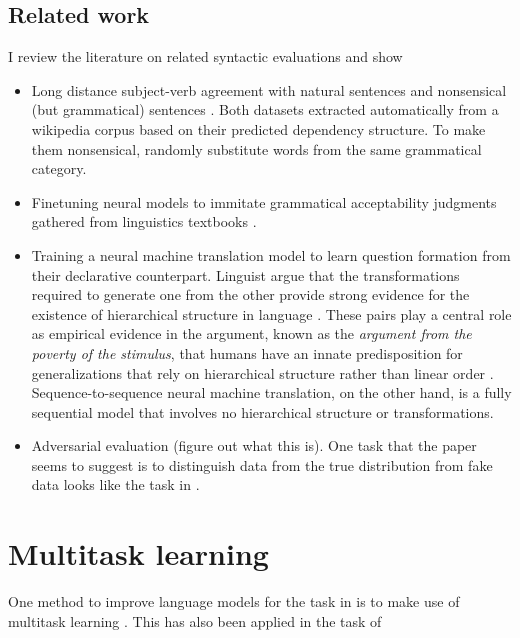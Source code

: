 \subsection{Related work}
I review the literature on related syntactic evaluations and show
\begin{itemize}
  \item Long distance subject-verb agreement with natural sentences \citep{Linzen+2016:LSTM-syntax,Kuncoro+2018:RNNG-deps,} and nonsensical (but grammatical) sentences \citep{Gulordava+2018:colorless-green}. Both datasets extracted automatically from a wikipedia corpus based on their predicted dependency structure. To make them nonsensical, \citet{Gulordava+2018:colorless-green} randomly substitute words from the same grammatical category.
  \item Finetuning neural models to immitate grammatical acceptability judgments gathered from linguistics textbooks \citet{DBLP:journals/corr/abs-1805-12471}.
  \item Training a neural machine translation model to learn question formation from their declarative counterpart\cite{McCoy+2018:RNN-pos}. Linguist argue that the transformations required to generate one from the other provide strong evidence for the existence of hierarchical structure in language \cite{Everaert+2015:structures}. These pairs play a central role as empirical evidence in the argument, known as the \textit{argument from the poverty of the stimulus}, that humans have an innate predisposition for generalizations that rely on hierarchical structure rather than linear order \citep{chomsky1980rules}. Sequence-to-sequence neural machine translation, on the other hand, is a fully sequential model that involves no hierarchical structure or transformations.
  \item Adversarial evaluation \citep{Smith2012:adversarial} (figure out what this is). One task that the paper seems to suggest is to distinguish data from the true distribution from fake data looks like the task in \citet{Linzen+2018:targeted}.
\end{itemize}


\section{Multitask learning}
One method to improve language models for the task in \citet{Linzen+2016:LSTM-syntax} is to make use of multitask learning \citep{Enguehard+2017:RNN-multitask}. This has also been applied in the task of \citet{}

